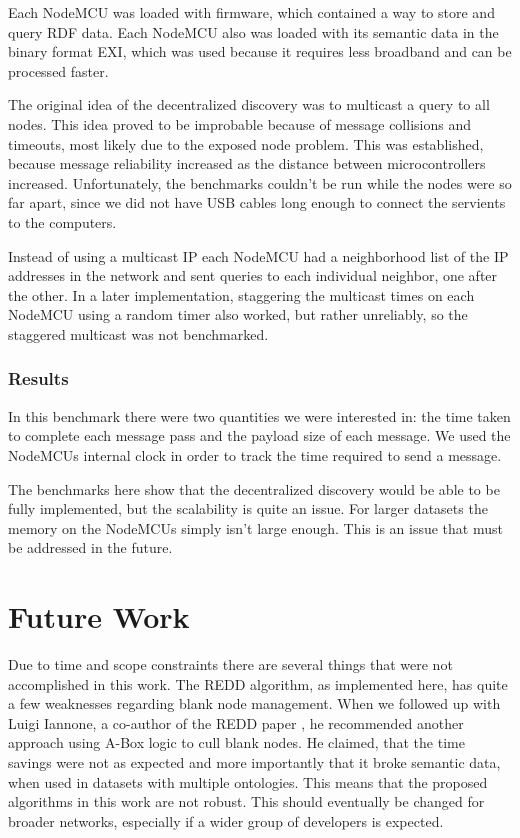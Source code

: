 Each NodeMCU was loaded with firmware, which contained a way to store and query RDF data. Each NodeMCU also was loaded with its semantic data in the binary format EXI, which was used because it requires less broadband and can be processed faster.

The original idea of the decentralized discovery was to multicast a query to all nodes. This idea proved to be improbable because of message collisions and timeouts, most likely due to the exposed node problem. This was established, because message reliability increased as the distance between microcontrollers increased. Unfortunately, the benchmarks couldn't be run while the nodes were so far apart, since we did not have USB cables long enough to connect the servients to the computers.

Instead of using a multicast IP each NodeMCU had a neighborhood list of the IP addresses in the network and sent queries to each individual neighbor, one after the other. In a later implementation, staggering the multicast times on each NodeMCU using a random timer also worked, but rather unreliably, so the staggered multicast was not benchmarked.


\subsubsection{Results}
In this benchmark there were two quantities we were interested in: the time taken to complete each message pass and the payload size of each message. We used the NodeMCUs internal clock in order to track the time required to send a message.

The benchmarks here show that the decentralized discovery would be able to be fully implemented, but the scalability is quite an issue. For larger datasets the memory on the NodeMCUs simply isn't large enough. This is an issue that must be addressed in the future.


\section{Future Work}

Due to time and scope constraints there are several things that were not accomplished in this work. The REDD algorithm, as implemented here, has quite a few weaknesses regarding blank node management. When we followed up with Luigi Iannone, a co-author of the REDD paper \cite{Esposito.2005}, he recommended another approach using A-Box logic to cull blank nodes. He claimed, that the time savings were not as expected and more importantly that it broke semantic data, when used in datasets with multiple ontologies. This means that the proposed algorithms in this work are not robust. This should eventually be changed for broader networks, especially if a wider group of developers is expected.

